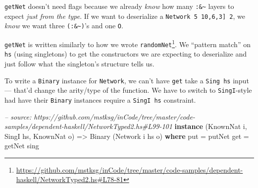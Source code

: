 \documentclass[]{article}
\newenvironment{Shaded}{}{}
\newcommand{\KeywordTok}[1]{\textcolor[rgb]{0.00,0.44,0.13}{\textbf{{#1}}}}
\newcommand{\DataTypeTok}[1]{\textcolor[rgb]{0.56,0.13,0.00}{{#1}}}
\newcommand{\CommentTok}[1]{\textcolor[rgb]{0.38,0.63,0.69}{\textit{{#1}}}}
\newcommand{\OtherTok}[1]{\textcolor[rgb]{0.00,0.44,0.13}{{#1}}}
\newcommand{\FunctionTok}[1]{\textcolor[rgb]{0.02,0.16,0.49}{{#1}}}
\newcommand{\NormalTok}[1]{{#1}}
\renewcommand{\href}[2]{#2\footnote{\url{#1}}}
\begin{document}
\begin{Shaded}
\end{Shaded}

\texttt{getNet} doesn't need flags because we already \emph{know} how many
\texttt{:\&\textasciitilde{}} layers to expect \emph{just from the type}. If we
want to deserialize a \texttt{Network\ 5\ \textquotesingle{}{[}10,6,3{]}\ 2}, we
\emph{know} we want three \texttt{(:\&\textasciitilde{})}'s and one \texttt{O}.

\texttt{getNet} is written similarly to how we wrote
\href{https://github.com/mstksg/inCode/tree/master/code-samples/dependent-haskell/NetworkTyped2.hs\#L78-81}{\texttt{randomNet\textquotesingle{}}}.
We ``pattern match'' on \texttt{hs} (using singletons) to get the constructors
we are expecting to deserialize and just follow what the singleton's structure
tells us.

To write a \texttt{Binary} instance for \texttt{Network}, we can't have
\texttt{get} take a \texttt{Sing\ hs} input --- that'd change the arity/type of
the function. We have to switch to \texttt{SingI}-style had have their
\texttt{Binary} instances require a \texttt{SingI\ hs} constraint.

\begin{Shaded}
\begin{Highlighting}[]
\CommentTok{-- source: https://github.com/mstksg/inCode/tree/master/code-samples/dependent-haskell/NetworkTyped2.hs#L99-101}
\KeywordTok{instance} \NormalTok{(}\DataTypeTok{KnownNat} \NormalTok{i, }\DataTypeTok{SingI} \NormalTok{hs, }\DataTypeTok{KnownNat} \NormalTok{o) }\OtherTok{=>} \DataTypeTok{Binary} \NormalTok{(}\DataTypeTok{Network} \NormalTok{i hs o) }\KeywordTok{where}
    \NormalTok{put }\FunctionTok{=} \NormalTok{putNet}
    \NormalTok{get }\FunctionTok{=} \NormalTok{getNet sing}
\end{Highlighting}
\end{Shaded}
\end{document}
